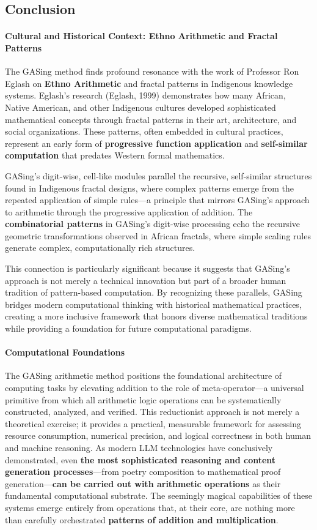 \subsection{Conclusion}
\paragraph{Cultural and Historical Context: Ethno Arithmetic and Fractal Patterns}
The GASing method finds profound resonance with the work of Professor Ron Eglash on \textbf{Ethno Arithmetic} and fractal patterns in Indigenous knowledge systems. Eglash's research (Eglash, 1999) demonstrates how many African, Native American, and other Indigenous cultures developed sophisticated mathematical concepts through fractal patterns in their art, architecture, and social organizations. These patterns, often embedded in cultural practices, represent an early form of \textbf{progressive function application} and \textbf{self-similar computation} that predates Western formal mathematics.

GASing's digit-wise, cell-like modules parallel the recursive, self-similar structures found in Indigenous fractal designs, where complex patterns emerge from the repeated application of simple rules—a principle that mirrors GASing's approach to arithmetic through the progressive application of addition. The \textbf{combinatorial patterns} in GASing's digit-wise processing echo the recursive geometric transformations observed in African fractals, where simple scaling rules generate complex, computationally rich structures.

This connection is particularly significant because it suggests that GASing's approach is not merely a technical innovation but part of a broader human tradition of pattern-based computation. By recognizing these parallels, GASing bridges modern computational thinking with historical mathematical practices, creating a more inclusive framework that honors diverse mathematical traditions while providing a foundation for future computational paradigms.

\paragraph{Computational Foundations}
The GASing arithmetic method positions the foundational architecture of computing tasks by elevating addition to the role of meta-operator—a universal primitive from which all arithmetic logic operations can be systematically constructed, analyzed, and verified. This reductionist approach is not merely a theoretical exercise; it provides a practical, measurable framework for assessing resource consumption, numerical precision, and logical correctness in both human and machine reasoning. As modern LLM technologies have conclusively demonstrated, even \textbf{the most sophisticated reasoning and content generation processes}—from poetry composition to mathematical proof generation—\textbf{can be carried out with arithmetic operations} as their fundamental computational substrate. The seemingly magical capabilities of these systems emerge entirely from operations that, at their core, are nothing more than carefully orchestrated \textbf{patterns of addition and multiplication}.

